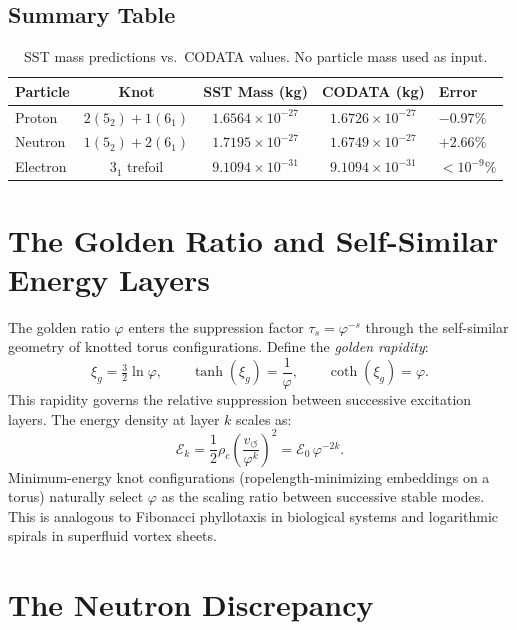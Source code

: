 \documentclass[11pt,a4paper]{article}
\begin{document}
\subsection{Summary Table}

\begin{table}[H]
\centering
\begin{tabular}{lcccl}
\toprule
\textbf{Particle} & \textbf{Knot} & \textbf{SST Mass (kg)} &
\textbf{CODATA (kg)} & \textbf{Error} \\
\midrule
Proton   & $2(5_2)+1(6_1)$ & $1.6564\times10^{-27}$ & $1.6726\times10^{-27}$ & $-0.97\%$ \\
Neutron  & $1(5_2)+2(6_1)$ & $1.7195\times10^{-27}$ & $1.6749\times10^{-27}$ & $+2.66\%$ \\
Electron & $3_1$ trefoil   & $9.1094\times10^{-31}$ & $9.1094\times10^{-31}$ & $<10^{-9}\%$ \\
\bottomrule
\end{tabular}
\caption{SST mass predictions vs.\ CODATA values. No particle mass used as input.}
\end{table}

\section{The Golden Ratio and Self-Similar Energy Layers}\label{sec:golden}

The golden ratio $\varphi$ enters the suppression factor $\tau_s = \varphi^{-s}$
through the self-similar geometry of knotted torus configurations. Define the
\emph{golden rapidity}:
\[
  \xi_g = \tfrac{3}{2}\ln\varphi, \qquad
  \tanh(\xi_g) = \frac{1}{\varphi}, \qquad
  \coth(\xi_g) = \varphi.
\]
This rapidity governs the relative suppression between successive excitation layers.
The energy density at layer $k$ scales as:
\[
  \mathcal{E}_k = \frac{1}{2}\rho_c\left(\frac{v_{\circlearrowleft}}{\varphi^k}\right)^2
  = \mathcal{E}_0\,\varphi^{-2k}.
\]
Minimum-energy knot configurations (ropelength-minimizing embeddings on a torus)
naturally select $\varphi$ as the scaling ratio between successive stable modes.
This is analogous to Fibonacci phyllotaxis in biological systems and
logarithmic spirals in superfluid vortex sheets.

\section{The Neutron Discrepancy}\label{sec:neutron}
\end{document}
